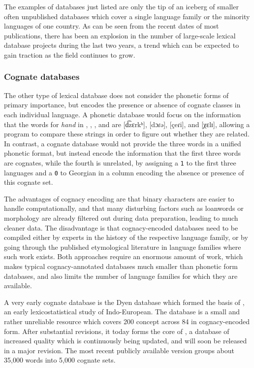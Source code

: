 The examples of databases just listed are only the tip of an iceberg of smaller often unpublished databases which cover a single language family or the minority languages of one country. As can be seen from the recent dates of most publications, there has been an explosion in the number of large-scale lexical database projects during the last two years, a trend which can be expected to gain traction as the field continues to grow.

\subsubsection{Cognate databases}
The other type of lexical database does not consider the phonetic forms of primary importance, but encodes the presence or absence of cognate classes in each individual language. A phonetic database would focus on the information that the words for \textit{hand} in , , , and  are 
[d͡zεrkʰ], [dɔɾə], [çeɾi], and [χεlɪ], allowing a program to compare these strings in order to figure out whether they are related. In contrast, a cognate database would not provide the three words in a unified phonetic format, but instead encode the information that the first three words are cognates, while the fourth is unrelated, by assigning a \texttt{1} to the first three languages  and a \texttt{0} to Georgian in a column encoding the absence or presence of this cognate set.

The advantages of cognacy encoding are that binary characters are easier to handle computationally, and that many disturbing factors such as loanwords or morphology are already filtered out during data preparation, leading to much cleaner data. The disadvantage is that cognacy-encoded databases need to be compiled either by experts in the history of the respective language family, or by going through the published etymological literature in language families where such work exists. Both approaches require an enormous amount of work, which makes typical cognacy-annotated databases much smaller than phonetic form databases, and also limits the number of language families for which they are available.

A very early cognate database is the Dyen database which formed the basis of \citet{dyen_ea_1992}, an early lexicostatistical study of Indo-European. The database is a small and rather unreliable resource \citep{geisler_list_2010} which covers 200 concept across 84  in cognacy-encoded form. After substantial revisions, it today forms the core of  \citep{ielex}, a database of increased quality which is continuously being updated, and will soon be released in a major revision. The most recent publicly available version groups about 35,000 words into 5,000 cognate sets.

